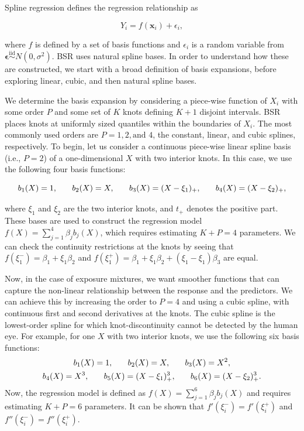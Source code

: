 \documentclass[12pt, twoside]{amherstthesis}
\begin{document}
Spline regression defines the regression relationship as

\[
Y_i = f(\textbf{x}_i) + \epsilon_i,
\]

\noindent where \(f\) is defined by a set of basis functions and \(\epsilon_i\) is a random variable from \(\boldsymbol\epsilon \overset{\mathrm{iid}}{\sim} N(0, \sigma^2)\). BSR uses natural spline bases. In order to understand how these are constructed, we start with a broad definition of basis expansions, before exploring linear, cubic, and then natural spline bases.

We determine the basis expansion by considering a piece-wise function of \(X_i\) with some order \(P\) and some set of \(K\) knots defining \(K+1\) disjoint intervals. BSR places knots at uniformly sized quantiles within the boundaries of \(X_i\). The most commonly used orders are \(P=1,2,\textrm{and } 4\), the constant, linear, and cubic splines, respectively. To begin, let us consider a continuous piece-wise linear spline basis (i.e., \(P=2\)) of a one-dimensional \(X\) with two interior knots. In this case, we use the following four basis functions:

\nointerlineskip

\[
b_1(X)=1, \hspace{0.25in} b_2(X)=X, \hspace{0.25in} b_3(X)=(X-\xi_1)_+, \hspace{0.25in} b_4(X)=(X-\xi_2)_+,
\]

\noindent where \(\xi_1\) and \(\xi_2\) are the two interior knots, and \(t_+\) denotes the positive part. These bases are used to construct the regression model \(f(X)=\sum_{j=1}^4\beta_jb_j(X)\), which requires estimating \(K+P=4\) parameters. We can check the continuity restrictions at the knots by seeing that \(f(\xi_1^-)=\beta_1 + \xi_1\beta_2\) and \(f(\xi_1^+)= \beta_1 + \xi_1\beta_2+ (\xi_1-\xi_1)\beta_3\) are equal.

Now, in the case of exposure mixtures, we want smoother functions that can capture the non-linear relationship between the response and the predictors. We can achieve this by increasing the order to \(P=4\) and using a cubic spline, with continuous first and second derivatives at the knots. The cubic spline is the lowest-order spline for which knot-discontinuity cannot be detected by the human eye. For example, for one \(X\) with two interior knots, we use the following six basis functions:
\begin{gather*}
b_1(X)=1, \hspace{0.25in}b_2(X)=X, \hspace{0.25in}b_3(X)=X^2, \\
b_4(X)=X^3, \hspace{0.25in} b_5(X)=(X-\xi_1)^3_+, \hspace{0.25in} b_6(X)=(X-\xi_2)^3_+.
\end{gather*}
\noindent Now, the regression model is defined as \(f(X)= \sum_{j=1}^6\beta_jb_j(X)\) and requires estimating \(K+P=6\) parameters. It can be shown that \(f'(\xi_i^-)= f'(\xi_i^+)\) and \(f''(\xi_i^-)= f''(\xi_i^+)\).
\end{document}
